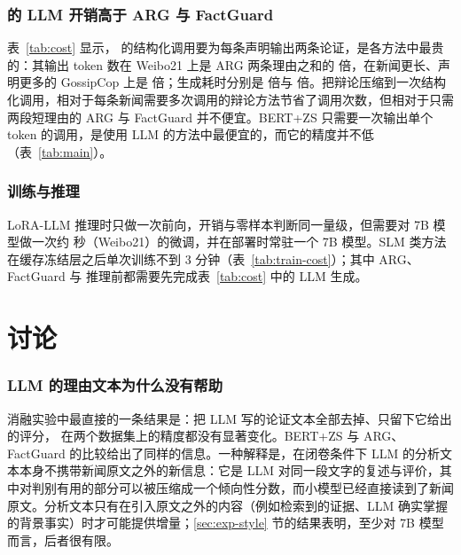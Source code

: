 \begin{table}[htbp]
\centering\small
\caption{每条新闻的 LLM 开销}\label{tab:cost}
\end{table}

\begin{table}[htbp]
\centering\small
\caption{可训练参数量与单次训练耗时}\label{tab:train-cost}
\end{table}

\subsubsection{\method{} 的 LLM 开销高于 ARG 与 FactGuard}
表~\ref{tab:cost} 显示，\method{} 的结构化调用要为每条声明输出两条论证，是各方法中最贵的：其输出 token 数在 Weibo21 上是 ARG 两条理由之和的  倍，在新闻更长、声明更多的 GossipCop 上是  倍；生成耗时分别是  倍与  倍。把辩论压缩到一次结构化调用，相对于每条新闻需要多次调用的辩论方法节省了调用次数，但相对于只需两段短理由的 ARG 与 FactGuard 并不便宜。BERT+ZS 只需要一次输出单个 token 的调用，是使用 LLM 的方法中最便宜的，而它的精度并不低（表~\ref{tab:main}）。

\subsubsection{训练与推理}
LoRA-LLM 推理时只做一次前向，开销与零样本判断同一量级，但需要对 7B 模型做一次约  秒（Weibo21）的微调，并在部署时常驻一个 7B 模型。SLM 类方法在缓存冻结层之后单次训练不到 3 分钟（表~\ref{tab:train-cost}）；其中 ARG、FactGuard 与 \method{} 推理前都需要先完成表~\ref{tab:cost} 中的 LLM 生成。

\section{讨论}\label{sec:discussion}

\subsubsection{LLM 的理由文本为什么没有帮助}
消融实验中最直接的一条结果是：把 LLM 写的论证文本全部去掉、只留下它给出的评分，\method{} 在两个数据集上的精度都没有显著变化。BERT+ZS 与 ARG、FactGuard 的比较给出了同样的信息。一种解释是，在闭卷条件下 LLM 的分析文本本身不携带新闻原文之外的新信息：它是 LLM 对同一段文字的复述与评价，其中对判别有用的部分可以被压缩成一个倾向性分数，而小模型已经直接读到了新闻原文。分析文本只有在引入原文之外的内容（例如检索到的证据、LLM 确实掌握的背景事实）时才可能提供增量；\ref{sec:exp-style} 节的结果表明，至少对 7B 模型而言，后者很有限。

